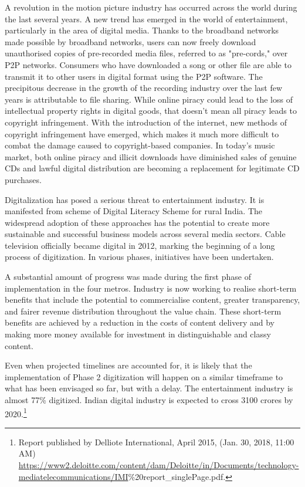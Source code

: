 \begin{multicols}{2}
\noi
A revolution in the motion picture industry has occurred across the world during the last
several years. A new trend has emerged in the world of entertainment, particularly in the area
of digital media. Thanks to the broadband networks made possible by broadband networks,
users can now freely download unauthorised copies of pre-recorded media files, referred to as
"pre-cords," over P2P networks. Consumers who have downloaded a song or other file are
able to transmit it to other users in digital format using the P2P software. The precipitous
decrease in the growth of the recording industry over the last few years is attributable to file
sharing. While online piracy could lead to the loss of intellectual property rights in digital
goods, that doesn't mean all piracy leads to copyright infringement. With the introduction of
the internet, new methods of copyright infringement have emerged, which makes it much
more difficult to combat the damage caused to copyright-based companies. In today's music
market, both online piracy and illicit downloads have diminished sales of genuine CDs and
lawful digital distribution are becoming a replacement for legitimate CD purchases.

\noi
Digitalization has posed a serious threat to entertainment industry. It is manifested from
scheme of Digital Literacy Scheme for rural India. The widespread adoption of these
approaches has the potential to create more sustainable and successful business models across
several media sectors. Cable television officially became digital in 2012, marking the
beginning of a long process of digitization. In various phases, initiatives have been
undertaken.

\noi
A substantial amount of progress was made during the first phase of implementation in the
four metros. Industry is now working to realise short-term benefits that include the potential
to commercialise content, greater transparency, and fairer revenue distribution throughout the
value chain. These short-term benefits are achieved by a reduction in the costs of content
delivery and by making more money available for investment in distinguishable and classy
content.

\noi
Even when projected timelines are accounted for, it is likely that the implementation of Phase
2 digitization will happen on a similar timeframe to what has been envisaged so far, but with a delay. The entertainment industry is almost 77\% digitized. Indian digital industry is expected to cross 3100 crores by 2020.\footnote{Report published by Delliote International, April 2015, (Jan. 30, 2018, 11:00 AM)\\  \url{https://www2.deloitte.com/content/dam/Deloitte/in/Documents/technology-mediatelecommunications/IMI}\%20report\_singlePage.pdf.}


\end{multicols}
